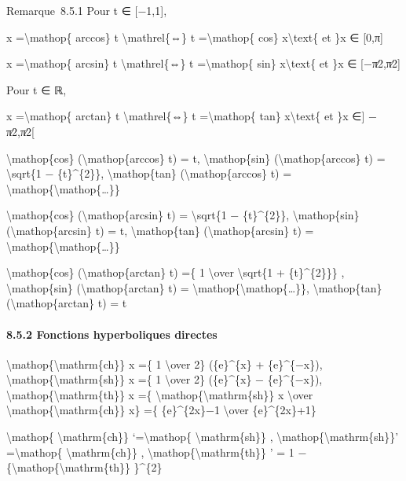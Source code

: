 \documentclass[]{article}
\begin{document}
Remarque~8.5.1 Pour t ∈ {[}−1,1{]},

x =\textbackslash{}mathop\{ arccos\} t \textbackslash{}mathrel\{⇔\} t
=\textbackslash{}mathop\{ cos\} x\textbackslash{}text\{ et \}x ∈
{[}0,π{]}

x =\textbackslash{}mathop\{ arcsin\} t \textbackslash{}mathrel\{⇔\} t
=\textbackslash{}mathop\{ sin\} x\textbackslash{}text\{ et \}x ∈
{[}−π∕2,π∕2{]}

Pour t ∈ ℝ,

x =\textbackslash{}mathop\{ arctan\} t \textbackslash{}mathrel\{⇔\} t
=\textbackslash{}mathop\{ tan\} x\textbackslash{}text\{ et \}x ∈{]} −
π∕2,π∕2{[}

\textbackslash{}mathop\{cos\} (\textbackslash{}mathop\{arccos\} t) = t,
\textbackslash{}mathop\{sin\} (\textbackslash{}mathop\{arccos\} t) =
\textbackslash{}sqrt\{1 − \{t\}\^{}\{2\}\},
\textbackslash{}mathop\{tan\} (\textbackslash{}mathop\{arccos\} t) =
\textbackslash{}mathop\{\textbackslash{}mathop\{\ldots{}\}\}

\textbackslash{}mathop\{cos\} (\textbackslash{}mathop\{arcsin\} t) =
\textbackslash{}sqrt\{1 − \{t\}\^{}\{2\}\},
\textbackslash{}mathop\{sin\} (\textbackslash{}mathop\{arcsin\} t) = t,
\textbackslash{}mathop\{tan\} (\textbackslash{}mathop\{arcsin\} t) =
\textbackslash{}mathop\{\textbackslash{}mathop\{\ldots{}\}\}

\textbackslash{}mathop\{cos\} (\textbackslash{}mathop\{arctan\} t) =\{ 1
\textbackslash{}over \textbackslash{}sqrt\{1 + \{t\}\^{}\{2\}\}\} ,
\textbackslash{}mathop\{sin\} (\textbackslash{}mathop\{arctan\} t) =
\textbackslash{}mathop\{\textbackslash{}mathop\{\ldots{}\}\},
\textbackslash{}mathop\{tan\} (\textbackslash{}mathop\{arctan\} t) = t

\paragraph{8.5.2 Fonctions hyperboliques directes}

\textbackslash{}mathop\{\textbackslash{}mathrm\{ch\}\} x =\{ 1
\textbackslash{}over 2\} (\{e\}\^{}\{x\} + \{e\}\^{}\{−x\}),
\textbackslash{}mathop\{\textbackslash{}mathrm\{sh\}\} x =\{ 1
\textbackslash{}over 2\} (\{e\}\^{}\{x\} − \{e\}\^{}\{−x\}),
\textbackslash{}mathop\{\textbackslash{}mathrm\{th\}\} x =\{
\textbackslash{}mathop\{\textbackslash{}mathrm\{sh\}\} x
\textbackslash{}over
\textbackslash{}mathop\{\textbackslash{}mathrm\{ch\}\} x\} =\{
\{e\}\^{}\{2x\}−1 \textbackslash{}over \{e\}\^{}\{2x\}+1\}

\textbackslash{}mathop\{ \textbackslash{}mathrm\{ch\}\}
`=\textbackslash{}mathop\{ \textbackslash{}mathrm\{sh\}\} ,
\textbackslash{}mathop\{\textbackslash{}mathrm\{sh\}\}'
=\textbackslash{}mathop\{ \textbackslash{}mathrm\{ch\}\} ,
\textbackslash{}mathop\{\textbackslash{}mathrm\{th\}\} ' = 1
−\{\textbackslash{}mathop\{\textbackslash{}mathrm\{th\}\} \}\^{}\{2\}
\end{document}
